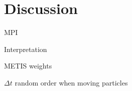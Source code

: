 \section{Discussion}
\label{sec:discussion}

MPI

Interpretation

METIS weights

$\Delta t$ random order when moving particles